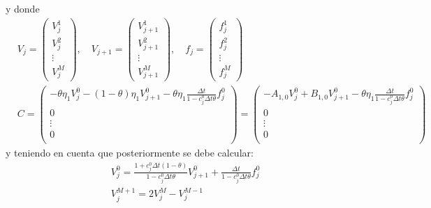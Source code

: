y donde
\begin{align*}
    &\boxed{
        V_j = \begin{pmatrix}
            V_j^1 \\
            V_j^2 \\
            \vdots \\
            V_j^M
        \end{pmatrix}, \quad
        V_{j+1} = \begin{pmatrix}
            V_{j+1}^1 \\
            V_{j+1}^2 \\
            \vdots \\
            V_{j+1}^M
        \end{pmatrix}, \quad
        f_j = \begin{pmatrix}
            f_j^1 \\
            f_j^2 \\
            \vdots \\
            f_j^M
        \end{pmatrix}
    } \\
    &\boxed{
        C = \begin{pmatrix}
            -\theta\eta_1 V_j^{0} - (1-\theta)\eta_1 V_{j+1}^{0} - \theta\eta_1 \frac{\Delta t}{1 - c_j^0 \Delta t \theta}f_j^0\\
            0 \\
            \vdots \\
            0 \\
        \end{pmatrix}
        = \begin{pmatrix}
            -A_{1,0}V_j^{0} + B_{1,0}V_{j+1}^{0} - \theta\eta_1 \frac{\Delta t}{1 - c_j^0 \Delta t \theta}f_j^0 \\
            0 \\
            \vdots \\
            0 \\
        \end{pmatrix}
    }
\end{align*}
y teniendo en cuenta que posteriormente se debe calcular:
\begin{align*}
    &\boxed{V_j^0 = \frac{1 + c_j^0 \Delta t (1-\theta)}{1 - c_j^0 \Delta t \theta} V_{j+1}^0 + \frac{\Delta t}{1 - c_j^0 \Delta t \theta} f_j^0} \\
    &\boxed{V_j^{M+1} = 2V_j^{M} - V_j^{M-1}}
\end{align*}











